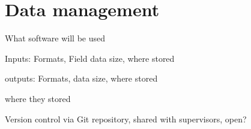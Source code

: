 \section*{Data management}\label{section:Data_management}

What software will be used

Inputs: Formats, Field data size, where stored

outputs: Formats, data size, where stored

where they stored

Version control via Git repository, shared with supervisors, open? 
